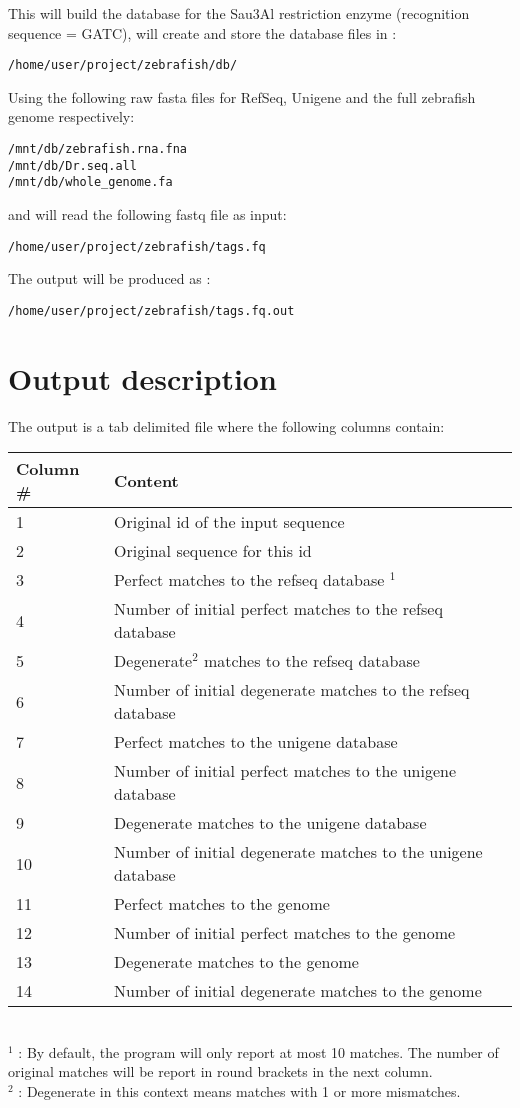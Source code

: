 \documentclass[a4paper,12pt]{article}
\begin{document}
This will build the database for the Sau3Al restriction enzyme (recognition sequence = GATC), will create and store the database files in :
\begin{verbatim}
/home/user/project/zebrafish/db/ 
\end{verbatim}
Using the following raw fasta files for RefSeq, Unigene and the full zebrafish genome respectively:

\begin{verbatim}
/mnt/db/zebrafish.rna.fna
/mnt/db/Dr.seq.all 
/mnt/db/whole_genome.fa
\end{verbatim}
and will read the following fastq file as input:
\begin{verbatim}
/home/user/project/zebrafish/tags.fq
\end{verbatim}
The output will be produced as :
\begin{verbatim}
/home/user/project/zebrafish/tags.fq.out
\end{verbatim}

 



\section{Output description}
\label{sec:outformat}

The output is a tab delimited file where the following columns contain: \\
\begin{tabular}{ll}
\hline
Column \# & Content \\
\hline
1 & Original id of the input sequence \\
2 & Original sequence for this id \\
3 & Perfect matches to the refseq database $^1$ \\
4 & Number of initial perfect matches to the refseq database \\
5 & Degenerate$^2$ matches to the refseq database  \\
6 & Number of initial degenerate matches to the refseq database \\
7 & Perfect matches to the unigene database  \\
8 & Number of initial perfect matches to the unigene database \\
9 & Degenerate matches to the unigene database  \\
10 & Number of initial degenerate matches to the unigene database \\
11 & Perfect matches to the genome  \\
12 & Number of initial perfect matches to the genome \\
13 & Degenerate matches to the genome  \\
14 & Number of initial degenerate matches to the genome \\
\hline
\end{tabular}
\\
$^1$ : By default, the program will only report at most 10 matches. The number of original matches will be report in round brackets in the next column. \\
$^2$ : Degenerate in this context means matches with 1 or more mismatches.
\end{document}
